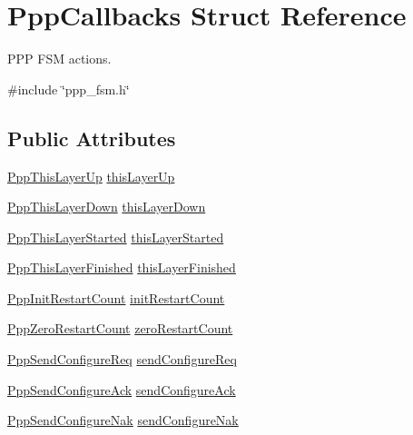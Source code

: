 \hypertarget{structPppCallbacks}{}\section{Ppp\+Callbacks Struct Reference}
\label{structPppCallbacks}


P\+PP F\+SM actions.  




{\ttfamily \#include \char`\"{}ppp\+\_\+fsm.\+h\char`\"{}}

\subsection*{Public Attributes}
\begin{DoxyCompactItemize}
\item 
\hyperlink{ppp__fsm_8h_af2c33e781717f7eeccba3b5ebac0524c}{Ppp\+This\+Layer\+Up} \hyperlink{structPppCallbacks_ab370c1403e9b8a362747e6ea4e702b2f}{this\+Layer\+Up}
\item 
\hyperlink{ppp__fsm_8h_a85e4e4b76b9c6ee9a9ea183186e2f828}{Ppp\+This\+Layer\+Down} \hyperlink{structPppCallbacks_a77b3640a9c7e6daae12df2b6912d1777}{this\+Layer\+Down}
\item 
\hyperlink{ppp__fsm_8h_ac7f910cb18b43d86c18b79f95fd302a1}{Ppp\+This\+Layer\+Started} \hyperlink{structPppCallbacks_ade673782b1b8570a6edd46cbb5338ae2}{this\+Layer\+Started}
\item 
\hyperlink{ppp__fsm_8h_a454f389f6cb679de4cb58f445b01dec8}{Ppp\+This\+Layer\+Finished} \hyperlink{structPppCallbacks_a615c0e66746e025074253d4a485c0f49}{this\+Layer\+Finished}
\item 
\hyperlink{ppp__fsm_8h_a65f1f9ed4177c139c61a532328cc4bbc}{Ppp\+Init\+Restart\+Count} \hyperlink{structPppCallbacks_aa601353760cb64fb60bf207e1fd9c281}{init\+Restart\+Count}
\item 
\hyperlink{ppp__fsm_8h_a64f6f78275b72385feff6b734cb3523c}{Ppp\+Zero\+Restart\+Count} \hyperlink{structPppCallbacks_a1a15264a659c18750ed7ca41dc893e04}{zero\+Restart\+Count}
\item 
\hyperlink{ppp__fsm_8h_a208d218e9a71164efa83c25973ed31ba}{Ppp\+Send\+Configure\+Req} \hyperlink{structPppCallbacks_a3455ce2a17fe9180f016be4bf7a07a56}{send\+Configure\+Req}
\item 
\hyperlink{ppp__fsm_8h_af1044cdf098c842dd6fad91d76453d46}{Ppp\+Send\+Configure\+Ack} \hyperlink{structPppCallbacks_ab2f369eb64bdca99ca48d9ea70d7e033}{send\+Configure\+Ack}
\item 
\hyperlink{ppp__fsm_8h_a4c0ae4d9b8997fedf5ab69442042884a}{Ppp\+Send\+Configure\+Nak} \hyperlink{structPppCallbacks_ac5d4b33b82d9d7553b6e8cf27a677349}{send\+Configure\+Nak}

\end{DoxyCompactItemize}

